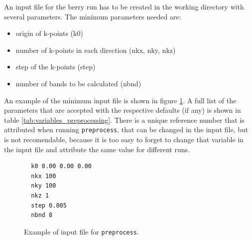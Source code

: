 \documentclass[a4paper,12pt]{report}
\begin{document}
 An input file for the berry run has to be created in the working directory with several parameters.
The minimum parameters needed are:
\begin{itemize}
 \item origin of k-points (k0)
 \item number of k-points in each direction (nkx, nky, nkz)
 \item step of the k-points (step)
 \item number of bands to be calculated (nbnd)
\end{itemize}

An example of the minimum input file is shown in figure \ref{code:inputfile}.
A full list of the parameters that are accepted with the respective defaults (if any)
is shown in table \ref{tab:variables_preprocessing}.
There is a unique reference number that is attributed when running \texttt{preprocess},
that can be changed in the input file, but is not recomendable, because it is too easy to forget
to change that variable in the input file and attribute the same value for different runs.

\begin{figure}[h]
 \centering
\begin{verbatim}
  k0 0.00 0.00 0.00
  nkx 100
  nky 100
  nkz 1
  step 0.005
  nbnd 8
\end{verbatim}
\caption{Example of input file for \texttt{preprocess}.}
\label{code:inputfile}
\end{figure}
\end{document}
